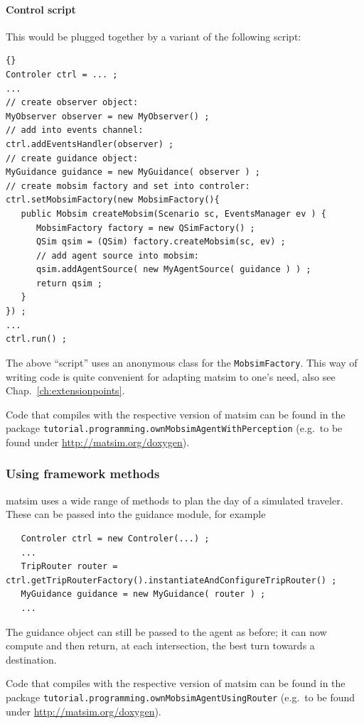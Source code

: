 \paragraph{Control script}

This would be plugged together by a variant of the following script:
\begin{lstlisting}[basicstyle=\footnotesize\tt]{}
Controler ctrl = ... ;
...
// create observer object:
MyObserver observer = new MyObserver() ;
// add into events channel:
ctrl.addEventsHandler(observer) ;
// create guidance object:
MyGuidance guidance = new MyGuidance( observer ) ;
// create mobsim factory and set into controler:
ctrl.setMobsimFactory(new MobsimFactory(){
   public Mobsim createMobsim(Scenario sc, EventsManager ev ) {
      MobsimFactory factory = new QSimFactory() ; 
      QSim qsim = (QSim) factory.createMobsim(sc, ev) ;
      // add agent source into mobsim:
      qsim.addAgentSource( new MyAgentSource( guidance ) ) ;
      return qsim ;
   }
}) ;
...
ctrl.run() ;
\end{lstlisting}
The above ``script'' uses an anonymous class for the \verb$MobsimFactory$.  This way of writing code is quite convenient for adapting \acrshort{matsim} to one's need, also see Chap.~\ref{ch:extensionpoints}.

Code that compiles with the respective version of \acrshort{matsim} can be found in the package \verb$tutorial.programming.ownMobsimAgentWithPerception$ (e.g.\ to be found under \url{http://matsim.org/doxygen}).

\subsubsection{Using framework methods}

\acrshort{matsim} uses a wide range of methods to plan the day of a simulated traveler.  These can be passed into the guidance module, for example
\begin{lstlisting}
   Controler ctrl = new Controler(...) ;
   ...
   TripRouter router = ctrl.getTripRouterFactory().instantiateAndConfigureTripRouter() ;
   MyGuidance guidance = new MyGuidance( router ) ;
   ...
\end{lstlisting}
The guidance object can still be passed to the agent as before; it can now compute and then return, at each intersection, the best turn towards a destination.

Code that compiles with the respective version of \acrshort{matsim} can be found in the package \verb$tutorial.programming.ownMobsimAgentUsingRouter$ (e.g.\ to be found under \url{http://matsim.org/doxygen}).



